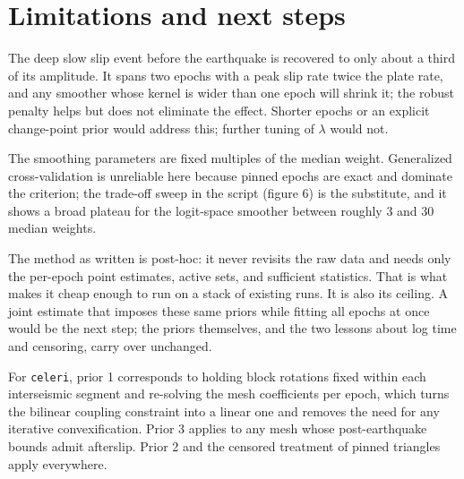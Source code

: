 \documentclass[11pt]{article}
\newcommand{\code}[1]{\texttt{#1}}
\begin{document}
\FloatBarrier
\section{Limitations and next steps}

The deep slow slip event before the earthquake is recovered to only about a third of its amplitude. It spans two epochs with a peak slip rate twice the plate rate, and any smoother whose kernel is wider than one epoch will shrink it; the robust penalty helps but does not eliminate the effect. Shorter epochs or an explicit change-point prior would address this; further tuning of $\lambda$ would not.

The smoothing parameters are fixed multiples of the median weight. Generalized cross-validation is unreliable here because pinned epochs are exact and dominate the criterion; the trade-off sweep in the script (figure 6) is the substitute, and it shows a broad plateau for the logit-space smoother between roughly 3 and 30 median weights.

The method as written is post-hoc: it never revisits the raw data and needs only the per-epoch point estimates, active sets, and sufficient statistics. That is what makes it cheap enough to run on a stack of existing runs. It is also its ceiling. A joint estimate that imposes these same priors while fitting all epochs at once would be the next step; the priors themselves, and the two lessons about log time and censoring, carry over unchanged.

For \code{celeri}, prior 1 corresponds to holding block rotations fixed within each interseismic segment and re-solving the mesh coefficients per epoch, which turns the bilinear coupling constraint into a linear one and removes the need for any iterative convexification. Prior 3 applies to any mesh whose post-earthquake bounds admit afterslip. Prior 2 and the censored treatment of pinned triangles apply everywhere.
\end{document}
